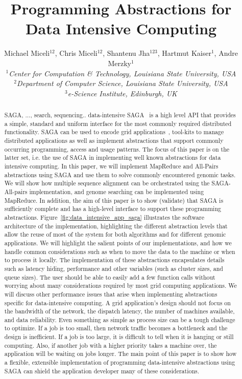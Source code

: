 \documentclass{rspublic}
\title{Programming Abstractions for Data Intensive Computing}
\author{Michael Miceli$^{12}$, Chris Miceli$^{12}$, Shantenu Jha$^{123}$,
  Hartmut Kaiser$^{1}$, Andre Merzky$^{1}$\\
  \small{\emph{$^{1}$Center for Computation \& Technology, Louisiana
      State University, USA}}\\
  \small{\emph{$^{2}$Department of Computer Science, Louisiana State
      University, USA}}\\
  \small{\emph{$^{3}$e-Science Institute, Edinburgh, UK}}\\
}
\begin{document}
\maketitle

\begin{abstract}{SAGA, ..., search, sequencing.. data-intensive}
  SAGA~\cite{saga_gfd90} is a high level API that provides a simple,
  standard and uniform interface for the most commonly required
  distributed functionality.  SAGA can be used to encode grid
  applications~\cite{saga_escience07, saga_tg08}, tool-kits to manage
  distributed applications as well as implement abstractions that
  support commonly occurring programming, access and usage patterns.
  The focus of this paper is on the latter set, i.e.  the use of SAGA
  in implementing well known abstractions for data intensive
  computing.  In this paper, we will implement MapReduce and All-Pairs
  abstractions using SAGA and use them to solve commonly encountered
  genomic tasks.  We will show how multiple sequence alignment can be
  orchestrated using the SAGA-All-pairs implementation, and genome
  searching can be implemented using MapReduce.  In addition, the aim
  of this paper is to show (validate) that SAGA is sufficiently
  complete and has a high-level interface to support these programming
  abstractions.  Figure~\ref{fig:data_intensive_app_saga} illustrates
  the software architecture of the implementation, highlighting the
  different abstraction levels that allow the reuse of most of the
  system for both algorithms and for different genomic applications.
  We will highlight the salient points of our implementations, and how
  we handle common considerations such as when to move the data to the
  machine or when to process it locally.  The implementation of these
  abstractions encapsulates details such as latency hiding,
  performance and other variables (such as cluster sizes, and queue
  sizes).  The user should be able to easily add a few function calls
  without worrying about many considerations required by most grid
  computing applications.  We will discuss other performance issues
  that arise when implementing abstractions specific for
  data-intensive computing.  A grid application's design should not
  focus on the bandwidth of the network, the dispatch latency, the
  number of machines available, and data reliability.  Even something
  as simple as process size can be a tough challenge to optimize.  If
  a job is too small, then network traffic becomes a bottleneck and
  the design is inefficient.  If a job is too large, it is difficult
  to tell when it is hanging or still computing.  Also, if another job
  with a higher priority takes a machine over, the application will be
  waiting on jobs longer.  The main point of this paper is to show how
  a flexible, extensible implementation of programming data-intensive
  abstractions using SAGA can shield the application developer many of
  these considerations.

\end{abstract}
\end{document}
